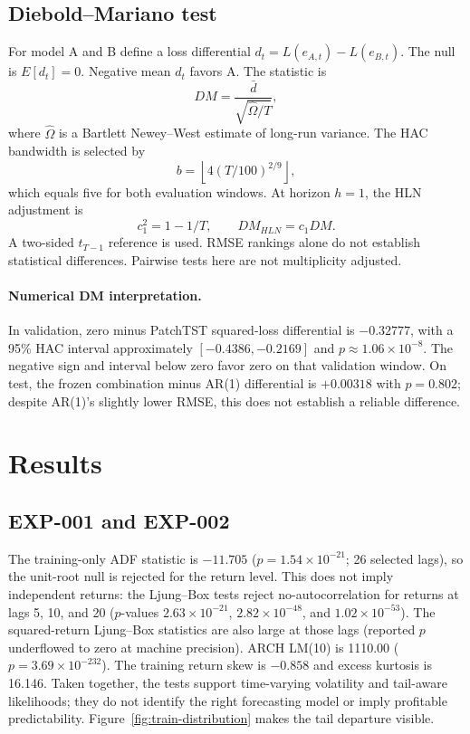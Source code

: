 \documentclass[11pt,a4paper]{article}
\begin{document}
\subsection{Diebold--Mariano test}
For model A and B define a loss differential $d_t=L(e_{A,t})-L(e_{B,t})$. The null is
$E[d_t]=0$. Negative mean $d_t$ favors A. The statistic is
\begin{equation}
 DM=\frac{\bar d}{\sqrt{\widehat\Omega/T}},
\end{equation}
where $\widehat\Omega$ is a Bartlett Newey--West estimate of long-run variance. The HAC
bandwidth is selected by
\begin{equation}
 b=\left\lfloor4(T/100)^{2/9}\right\rfloor,
\end{equation}
which equals five for both evaluation windows. At horizon $h=1$, the HLN adjustment is
\begin{equation}
 c_1^2=1-1/T,\qquad DM_{HLN}=c_1DM.
\end{equation}
A two-sided $t_{T-1}$ reference is used. RMSE rankings alone do not establish statistical
differences. Pairwise tests here are not multiplicity adjusted.

\paragraph{Numerical DM interpretation.} In validation, zero minus PatchTST squared-loss
differential is $-0.32777$, with a 95\% HAC interval approximately $[-0.4386,-0.2169]$ and
$p\approx1.06\times10^{-8}$. The negative sign and interval below zero favor zero on that
validation window. On test, the frozen combination minus AR(1) differential is $+0.00318$ with
$p=0.802$; despite AR(1)'s slightly lower RMSE, this does not establish a reliable difference.

\section{Results}
\subsection{EXP-001 and EXP-002}
The training-only ADF statistic is $-11.705$ ($p=1.54\times10^{-21}$; 26 selected lags), so the
unit-root null is rejected for the return level. This does not imply independent returns: the
Ljung--Box tests reject no-autocorrelation for returns at lags 5, 10, and 20 ($p$-values
$2.63\times10^{-21}$, $2.82\times10^{-48}$, and $1.02\times10^{-53}$). The squared-return
Ljung--Box statistics are also large at those lags (reported $p$ underflowed to zero at machine
precision). ARCH LM(10) is 1110.00 ($p=3.69\times10^{-232}$). The training return skew is
$-0.858$ and excess kurtosis is 16.146. Taken together, the tests support time-varying volatility
and tail-aware likelihoods; they do not identify the right forecasting model or imply profitable
predictability. Figure~\ref{fig:train-distribution} makes the tail departure visible.
\end{document}
